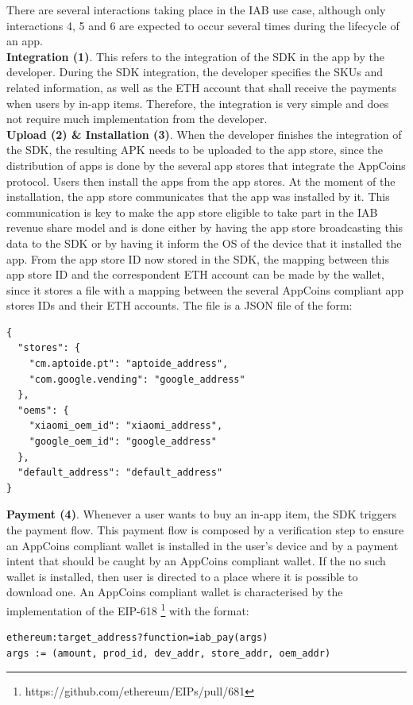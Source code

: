 There are several interactions taking place in the IAB use case, although only interactions \textsf{4}, \textsf{5} and \textsf{6} are expected to occur several times during the lifecycle of an app. \\

\noindent \textbf{Integration (1)}. This refers to the integration of the SDK in the app by the developer. During the SDK integration, the developer specifies the SKUs and related information, as well as the ETH account that shall receive the payments when users by in-app items. Therefore, the integration is very simple and does not require much implementation from the developer. \\

\noindent \textbf{Upload (2) \& Installation (3)}. When the developer finishes the integration of the SDK, the resulting APK needs to be uploaded to the app store, since the distribution of apps is done by the several app stores that integrate the AppCoins protocol. Users then install the apps from the app stores. At the moment of the installation, the app store communicates that the app was installed by it. This communication is key to make the app store eligible to take part in the IAB revenue share model and is done either by having the app store broadcasting this data to the SDK or by having it inform the OS of the device that it installed the app. From the app store ID now stored in the SDK, the mapping between this app store ID and the correspondent ETH account can be made by the wallet, since it stores a file with a mapping between the several AppCoins compliant app stores IDs and their ETH accounts. The file is a JSON file of the form:
\begin{tcolorbox}[enhanced jigsaw,sharp corners, drop fuzzy shadow=ShadowColor]
\begin{lstlisting}
{
  "stores": {
    "cm.aptoide.pt": "aptoide_address",
    "com.google.vending": "google_address"
  },
  "oems": {
    "xiaomi_oem_id": "xiaomi_address",
    "google_oem_id": "google_address"
  },
  "default_address": "default_address"
}
\end{lstlisting}
\end{tcolorbox} 

\vspace{0.2cm} \noindent \textbf{Payment (4)}. Whenever a user wants to buy an in-app item, the SDK triggers the payment flow. This payment flow is composed by a verification step to ensure an AppCoins compliant wallet is installed in the user's device and by a payment intent that should be caught by an AppCoins compliant wallet. If the no such wallet is installed, then user is directed to a place where it is possible to download one. An AppCoins compliant wallet is characterised by the implementation of the EIP-618 \footnote{https://github.com/ethereum/EIPs/pull/681} with the format:
\begin{lstlisting}
ethereum:target_address?function=iab_pay(args)
args := (amount, prod_id, dev_addr, store_addr, oem_addr)
\end{lstlisting}

